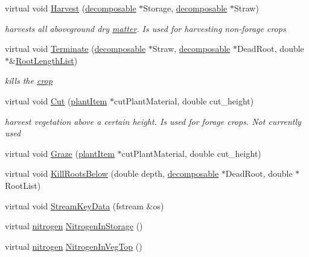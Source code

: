 \begin{DoxyCompactItemize}
virtual void \hyperlink{classcrop_a387dc393ee7cd05a40874739cff8579e}{Harvest} (\hyperlink{classdecomposable}{decomposable} $\ast$Storage, \hyperlink{classdecomposable}{decomposable} $\ast$Straw)
\begin{DoxyCompactList}\small\item\em harvests all aboveground dry \hyperlink{classmatter}{matter}. Is used for harvesting non-\/forage crops \item\end{DoxyCompactList}\item 
virtual void \hyperlink{classcrop_a8b5cf5b385f82405af121592f7106fc2}{Terminate} (\hyperlink{classdecomposable}{decomposable} $\ast$Straw, \hyperlink{classdecomposable}{decomposable} $\ast$DeadRoot, double $\ast$\&\hyperlink{classcrop_ad629acdfd462323490f91ad3ce9a7b59}{RootLengthList})
\begin{DoxyCompactList}\small\item\em kills the \hyperlink{classcrop}{crop} \item\end{DoxyCompactList}\item 
virtual void \hyperlink{classcrop_a5b2a6a3522c64790e295055ff164dc10}{Cut} (\hyperlink{classplant_item}{plantItem} $\ast$cutPlantMaterial, double cut\_\-height)
\begin{DoxyCompactList}\small\item\em harvest vegetation above a certain height. Is used for forage crops. Not currently used \item\end{DoxyCompactList}\item 
virtual void \hyperlink{classcrop_a4acf198494d9c34cf42f27e5a9f11032}{Graze} (\hyperlink{classplant_item}{plantItem} $\ast$cutPlantMaterial, double cut\_\-height)
\item 
virtual void \hyperlink{classcrop_a9c7ffd6332d9aa190c27618cbcaea767}{KillRootsBelow} (double depth, \hyperlink{classdecomposable}{decomposable} $\ast$DeadRoot, double $\ast$RootList)
\item 
virtual void \hyperlink{classcrop_a442c2c4c3198041f6480f1e6f3a1f35e}{StreamKeyData} (fstream \&os)
\item 
virtual \hyperlink{classnitrogen}{nitrogen} \hyperlink{classcrop_a4f4f31c68a905ef3fef26b9d7456cb36}{NitrogenInStorage} ()
\item 
virtual \hyperlink{classnitrogen}{nitrogen} \hyperlink{classcrop_a82bef6e98553aa173173b0ea454a3e0a}{NitrogenInVegTop} ()
\item 

\end{DoxyCompactItemize}
